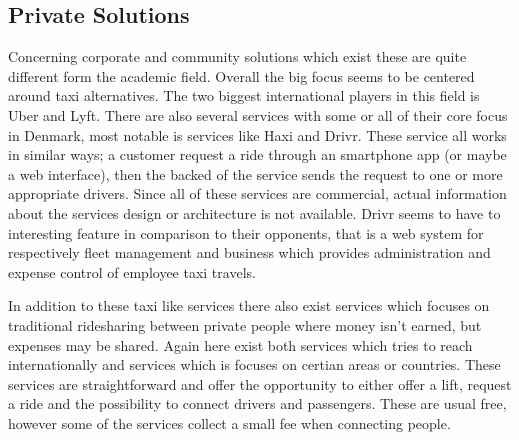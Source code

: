 \subsection{Private Solutions}
Concerning corporate and community solutions which exist these are quite different form the academic field.
Overall the big focus seems to be centered around taxi alternatives.
The two biggest international players in this field is Uber and Lyft.
There are also several services with some or all of their core focus in Denmark, most notable is services like Haxi and Drivr.
These service all works in similar ways; a customer request a ride through an smartphone app (or maybe a web interface), then the backed of the service sends the request to one or more appropriate drivers.
Since all of these services are commercial, actual information about the services design or architecture is not available.
Drivr seems to have to interesting feature in comparison to their opponents, that is a web system for respectively fleet management and business which provides administration and expense control of employee taxi travels.

In addition to these taxi like services there also exist services which focuses on traditional ridesharing between private people where money isn't earned, but expenses may be shared.
Again here exist both services which tries to reach internationally and services which is focuses on certian areas or countries.
These services are straightforward and offer the opportunity to either offer a lift, request a ride and the possibility to connect drivers and passengers.
These are usual free, however some of the services collect a small fee when connecting people. 